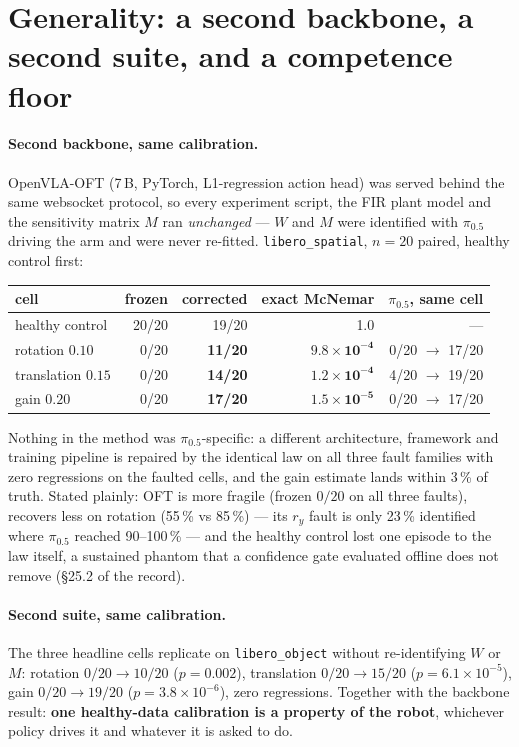 \documentclass[11pt,a4paper]{article}
\newcommand{\code}[1]{\texttt{\small #1}}
\begin{document}
\section{Generality: a second backbone, a second suite, and a competence floor}
\label{sec:generality}

\paragraph{Second backbone, same calibration.}
OpenVLA-OFT (7\,B, PyTorch, L1-regression action head) was served behind the same
websocket protocol, so every experiment script, the FIR plant model and the sensitivity
matrix $M$ ran \emph{unchanged} --- $W$ and $M$ were identified with $\pi_{0.5}$ driving the
arm and were never re-fitted. \code{libero\_spatial}, $n=20$ paired, healthy control first:

\begin{center}
\begin{tabular}{lrrrr}
\toprule
cell & frozen & corrected & exact McNemar & $\pi_{0.5}$, same cell \\
\midrule
healthy control  & 20/20 & 19/20 & 1.0 & --- \\
rotation $0.10$  & 0/20 & \textbf{11/20} & $\mathbf{9.8\times 10^{-4}}$ & 0/20 $\to$ 17/20 \\
translation $0.15$ & 0/20 & \textbf{14/20} & $\mathbf{1.2\times 10^{-4}}$ & 4/20 $\to$ 19/20 \\
gain $0.20$      & 0/20 & \textbf{17/20} & $\mathbf{1.5\times 10^{-5}}$ & 0/20 $\to$ 17/20 \\
\bottomrule
\end{tabular}
\end{center}

Nothing in the method was $\pi_{0.5}$-specific: a different architecture, framework and
training pipeline is repaired by the identical law on all three fault families with zero
regressions on the faulted cells, and the gain estimate lands within 3\,\% of truth.
Stated plainly: OFT is more fragile (frozen $0/20$ on all three faults), recovers less on
rotation (55\,\% vs 85\,\%) --- its $r_y$ fault is only 23\,\% identified where $\pi_{0.5}$
reached 90--100\,\% --- and the healthy control lost one episode to the law itself, a
sustained phantom that a confidence gate evaluated offline does not remove (\S25.2 of the
record).

\paragraph{Second suite, same calibration.}
The three headline cells replicate on \code{libero\_object} without re-identifying $W$ or
$M$: rotation $0/20 \to 10/20$ ($p = 0.002$), translation $0/20 \to 15/20$
($p = 6.1\times 10^{-5}$), gain $0/20 \to 19/20$ ($p = 3.8\times 10^{-6}$), zero
regressions. Together with the backbone result: \textbf{one healthy-data calibration is a
property of the robot}, whichever policy drives it and whatever it is asked to do.
\end{document}
